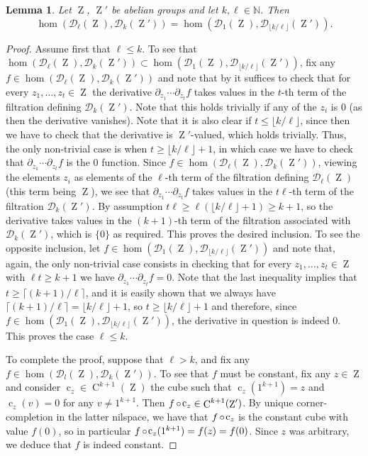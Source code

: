 \documentclass[a4paper,12pt,reqno]{amsart}
\newtheorem{lemma}[theorem]{Lemma}
\theoremstyle{definition}
\newcommand{\mc}{\mathcal}
\newcommand{\mb}{\mathbb}
\DeclareMathOperator{\ab}{Z}
\DeclareMathOperator{\q}{c}
\DeclareMathOperator{\co}{\circ\hspace{-0.02 cm}}
\DeclareMathOperator{\cu}{C}
\begin{document}
\begin{lemma}\label{lem:higher-ab-hom-set}
Let $\ab$, $\ab'$ be abelian groups and let $k,\ell\in\mb{N}$. Then
\begin{equation}
 \hom(\mc{D}_{\ell}(\ab),\mc{D}_k(\ab'))=   \hom(\mc{D}_1(\ab),\mc{D}_{\lfloor k/\ell\rfloor}(\ab')).
\end{equation}
\end{lemma}

\begin{proof}
Assume first that $\ell\le k$. To see that $\hom(\mc{D}_{\ell}(\ab),\mc{D}_k(\ab'))\subset \hom(\mc{D}_1(\ab),\mc{D}_{\lfloor k/\ell\rfloor}(\ab'))$, fix any $f\in \hom(\mc{D}_\ell(\ab),\mc{D}_k(\ab'))$ and note that by \cite[Theorem 2.2.14]{Cand:Notes1} it suffices to check that for every $z_1,\ldots,z_t\in \ab$ the derivative $\partial_{z_1}\cdots \partial_{z_t}f$ takes values in the $t$-th term of the filtration defining  $\mc{D}_k(\ab')$. Note that this holds trivially if any of the $z_i$ is 0 (as then the derivative vanishes). Note that it is also clear if $t\le \lfloor k/\ell\rfloor$, since then we have to check that the derivative is $\ab'$-valued, which holds trivially. Thus, the only non-trivial case is when $t\ge \lfloor k/\ell\rfloor+1$, in which case we have to check that $\partial_{z_1}\cdots \partial_{z_t}f$ is the 0 function. Since $f\in \hom(\mc{D}_\ell(\ab),\mc{D}_k(\ab'))$, viewing the elements $z_i$ as elements of the $\ell$-th term of the filtration defining $\mc{D}_\ell(\ab)$ (this term being $\ab$), we see that $\partial_{z_1}\cdots \partial_{z_t}f$ takes values in the $t\ell$-th term of the filtration $\mc{D}_k(\ab')$. By assumption $t\ell\ge \ell(\lfloor k/\ell\rfloor+1)\ge k+1$, so the derivative takes values in the $(k+1)$-th term of the filtration associated with $\mc{D}_k(\ab')$, which is $\{0\}$ as required. This proves the desired inclusion. To see the opposite inclusion, let $f\in \hom(\mc{D}_1(\ab),\mc{D}_{\lfloor k/\ell\rfloor}(\ab'))$ and note that, again, the only non-trivial case consists in checking that for every $z_1,\ldots,z_t\in \ab$ with $\ell t\ge k+1$ we have $\partial_{z_1}\cdots \partial_{z_t}f=0$. Note that the last inequality implies that $t\ge \lceil (k+1)/\ell\rceil$, and it is easily shown that we always have $\lceil (k+1)/\ell\rceil=\lfloor k/\ell\rfloor+1$, so $t\ge \lfloor k/\ell\rfloor+1$ and therefore, since $f\in \hom(\mc{D}_1(\ab),\mc{D}_{\lfloor k/\ell\rfloor}(\ab'))$, the derivative in question is indeed 0. This proves the case $\ell\leq k$.

To complete the proof, suppose that  $\ell>k$, and  fix any $f\in \hom(\mc{D}_l(\ab),\mc{D}_k(\ab'))$. To see that $f$ must be constant, fix any $z\in \ab$ and consider $\q_z\in \cu^{k+1}(\ab)$ the cube such that $\q_z(1^{k+1})=z$ and $\q_z(v)=0$ for any $v\neq 1^{k+1}$. Then $f\co \q_z\in \cu^{k+1}(\ab')$. By unique corner-completion in the latter nilspace, we have that $f\co\q_z$ is the constant cube with value $f(0)$, so in particular $f\co \q_z(1^{k+1})=f(z)=f(0)$. Since $z$ was arbitrary, we deduce that $f$ is indeed constant.
\end{proof}
\end{document}
